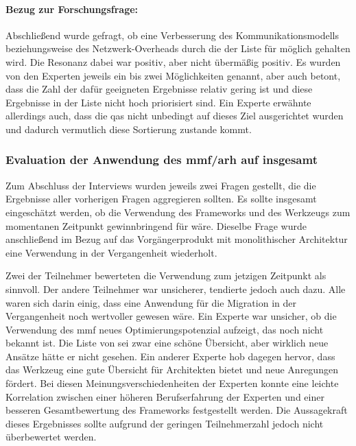 \paragraph{Bezug zur Forschungsfrage:} Abschließend wurde gefragt, ob eine Verbesserung des Kom\-mu\-ni\-ka\-ti\-ons\-mo\-dells beziehungsweise des Netzwerk-Overheads durch die \bpp der Liste für möglich gehalten wird.
Die Resonanz dabei war positiv, aber nicht übermäßig positiv.
Es wurden von den Experten jeweils ein bis zwei Möglichkeiten genannt, aber auch betont, dass die Zahl der dafür geeigneten Ergebnisse relativ gering ist und diese Ergebnisse in der Liste nicht hoch priorisiert sind.
Ein Experte erwähnte allerdings auch, dass die \glspl{qa} nicht unbedingt auf dieses Ziel ausgerichtet wurden und dadurch vermutlich diese Sortierung zustande kommt.

\subsubsection{Evaluation der Anwendung des \gls{mmf}/\gls{arh} auf \jf insgesamt}
\label{sec:evaluation-mmf-anwendung-insgesamt}

Zum Abschluss der Interviews wurden jeweils zwei Fragen gestellt, die die Ergebnisse aller vor\-he\-ri\-gen Fragen aggregieren sollten.
Es sollte insgesamt eingeschätzt werden, ob die Verwendung des Frameworks und des Werkzeugs zum momentanen Zeitpunkt gewinnbringend für \jf wäre.
Dieselbe Frage wurde anschließend im Bezug auf das Vorgängerprodukt mit monolithischer Architektur eine Verwendung in der Vergangenheit wiederholt.

Zwei der Teilnehmer bewerteten die Verwendung zum jetzigen Zeitpunkt als sinnvoll.
Der andere Teilnehmer war unsicherer, tendierte jedoch auch dazu.
Alle waren sich darin einig, dass eine Anwendung für die Migration in der Vergangenheit noch wertvoller gewesen wäre.
Ein Experte war unsicher, ob die Verwendung des \gls{mmf} neues Optimierungspotenzial aufzeigt, das noch nicht bekannt ist.
Die Liste von \bpp sei zwar eine schöne Übersicht, aber wirklich neue Ansätze hätte er nicht gesehen.
Ein anderer Experte hob dagegen hervor, dass das Werkzeug eine gute Übersicht für Architekten bietet und neue Anregungen fördert.
Bei diesen Meinungsverschiedenheiten der Experten konnte eine leichte Korrelation zwischen einer höheren Berufserfahrung der Experten und einer besseren Gesamtbewertung des Frameworks festgestellt werden.
Die Aussagekraft dieses Ergebnisses sollte aufgrund der geringen Teilnehmerzahl jedoch nicht überbewertet werden.


